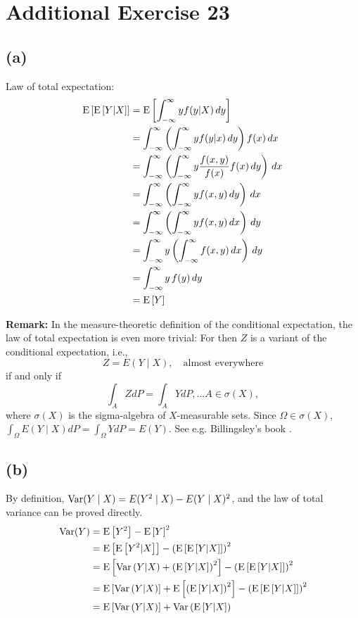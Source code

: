 \section*{Additional Exercise 23}
\subsection*{(a)}
Law of total expectation:
\begin{align*}
\mathrm{E}\left[\mathrm{E}\left[Y|X\right]\right] &= \mathrm{E}\left[\int_{-\infty}^{\infty} yf(y|X)\, dy \right]\\
&= \int_{-\infty}^{\infty} \left(\int_{-\infty}^{\infty} yf(y|x)\, dy\right) f(x) \, dx\\
&= \int_{-\infty}^{\infty} \left(\int_{-\infty}^{\infty} y\frac{f(x,y)}{f(x)}f(x) \, dy\right)\, dx\\
&= \int_{-\infty}^{\infty} \left(\int_{-\infty}^{\infty} y f(x,y) \, dy\right)\, dx\\
&= \int_{-\infty}^{\infty} \left(\int_{-\infty}^{\infty} y f(x,y) \, dx\right)\, dy\\
&= \int_{-\infty}^{\infty} y\left(\int_{-\infty}^{\infty} f(x,y) \, dx\right)\, dy\\
&= \int_{-\infty}^{\infty} y \, f(y)\, dy\\
&= \mathrm{E}\left[Y\right]
\end{align*}

\textbf{Remark:} In the measure-theoretic definition of the conditional expectation, the law of total expectation is even more trivial: For then $Z$ is a variant of the conditional expectation, i.e.,
\[
Z=E(Y\mid X),\quad\textrm{almost everywhere}
\]
if and only if
\[
\int_{A}ZdP=\int_{A}YdP,\ldots A\in\sigma(X),
\]
where $\sigma(X)$ is the sigma-algebra of $X$-measurable sets. Since
$\Omega\in\sigma(X)$, $\int_{\Omega}E(Y\mid X)dP=\int_{\Omega}YdP=E(Y)$. See e.g. Billingsley's book \parencite[Chapter 34]{Billingsley1995-pp}.



\subsection*{(b)}
By definition, $\mathrm{Var}(Y\mid X)=E(Y^{2}\mid X)-E(Y\mid X)^{2}$, and the law of total variance can be proved directly.
\begin{align*}
\mathrm{Var}(Y) &= \mathrm{E}\left[Y^{2}\right] - \mathrm{E}\left[Y\right]^{2}\\
&= \mathrm{E}\left[\mathrm{E}\left[Y^{2}|X\right]\right] - \left(\mathrm{E}\left[\mathrm{E}\left[Y|X\right]\right]\right)^{2}\\
&= \mathrm{E}\left[\mathrm{Var}\left(Y|X\right) + \left(\mathrm{E}\left[Y|X\right]\right)^{2}\right] - \left(\mathrm{E}\left[\mathrm{E}\left[Y|X\right]\right]\right)^{2}\\
&= \mathrm{E}\left[\mathrm{Var}\left(Y|X\right)\right] + \mathrm{E}\left[\left(\mathrm{E}\left[Y|X\right]\right)^{2}\right] - \left(\mathrm{E}\left[\mathrm{E}\left[Y|X\right]\right]\right)^{2}\\
&= \mathrm{E}\left[\mathrm{Var}\left(Y|X\right)\right] + \mathrm{Var}\left(\mathrm{E}\left[Y|X\right]\right)
\end{align*}


\vspace{\baselineskip}